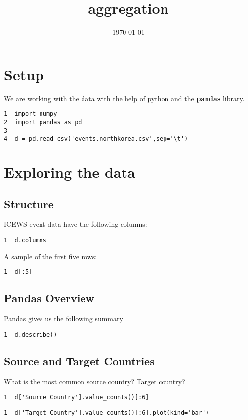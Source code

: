 \documentclass[11pt]{article}
\date{\today}
\title{aggregation}
\begin{document}
\maketitle
\tableofcontents

\section{Setup}
\label{sec-1}
We are working with the data with the help of python and the \textbf{pandas} library.

\begin{verbatim}
1  import numpy
2  import pandas as pd
3  
4  d = pd.read_csv('events.northkorea.csv',sep='\t')
\end{verbatim}

\section{Exploring the data}
\label{sec-2}

\subsection{Structure}
\label{sec-2-1}
ICEWS event data have the following columns:

\begin{verbatim}
1  d.columns
\end{verbatim}

A sample of the first five rows:
\begin{verbatim}
1  d[:5]
\end{verbatim}

\subsection{Pandas Overview}
\label{sec-2-2}
Pandas gives us the following summary
\begin{verbatim}
1  d.describe()
\end{verbatim}

\subsection{Source and Target Countries}
\label{sec-2-3}
What is the most common source country? Target country?
\begin{verbatim}
1  d['Source Country'].value_counts()[:6]
\end{verbatim}

\begin{verbatim}
1  d['Target Country'].value_counts()[:6].plot(kind='bar')
\end{verbatim}
\end{document}
